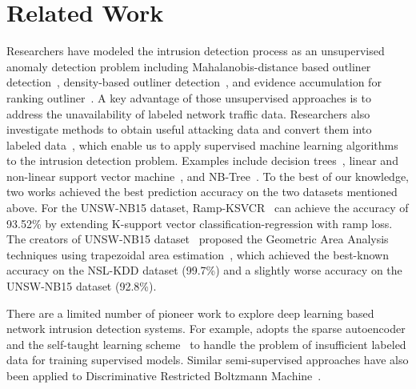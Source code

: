 \section{Related Work}
Researchers have modeled the intrusion detection process as an unsupervised
anomaly detection problem including Mahalanobis-distance based outliner detection~\cite{ComparativeAnomalyNIDS}, density-based outliner detection~\cite{LOF}, and evidence accumulation for ranking outliner~\cite{RankingOutliner}.
A key advantage of those unsupervised approaches is to address the unavailability of labeled network traffic data. Researchers also investigate methods to obtain useful attacking data and convert them into labeled data~\cite{KDDCup, NSL-KDD, UNSW}, which enable us to apply supervised machine learning algorithms to the intrusion detection problem.
Examples include decision trees~\cite{DecisionTree}, linear and non-linear support vector machine~\cite{SVM}, and NB-Tree~\cite{NB-Tree}. To the best of our knowledge, two works achieved the best prediction accuracy on the two datasets mentioned above.
For the UNSW-NB15 dataset, Ramp-KSVCR~\cite{RampLossKSVCR} can achieve the accuracy of 93.52\% by extending K-support vector classification-regression with ramp loss. 
The creators of UNSW-NB15 dataset~\cite{UNSW} proposed the Geometric Area Analysis techniques using trapezoidal area estimation~\cite{GAA-ADS}, which achieved the best-known accuracy on the NSL-KDD dataset (99.7\%) and
a slightly worse accuracy on the UNSW-NB15 dataset (92.8\%).

There are a limited number of pioneer work to explore deep learning based network intrusion detection systems. For example, \cite{STL-NIDS} adopts the sparse autoencoder and the self-taught learning scheme~\cite{SparseAE} to handle the problem of insufficient labeled data for training supervised models. Similar semi-supervised approaches have also been applied to
Discriminative Restricted Boltzmann Machine~\cite{AnomalyDetectionRBM}.